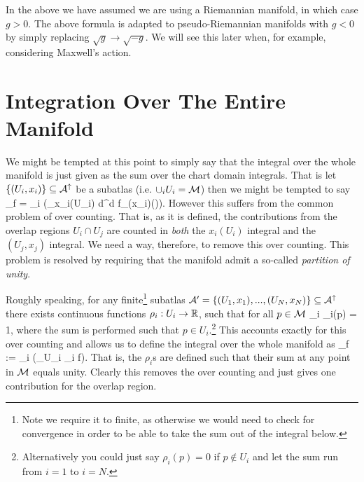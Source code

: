 \br 
    In the above we have assumed we are using a Riemannian manifold, in which case $g>0$. The above formula is adapted to pseudo-Riemannian manifolds with $g<0$ by simply replacing $\sqrt{g} \to \sqrt{-g}$. We will see this later when, for example, considering Maxwell's action. 
\er 

\section{Integration Over The Entire Manifold}

We might be tempted at this point to simply say that the integral over the whole manifold is just given as the sum over the chart domain integrals. That is let $\{(U_i,x_i)\}\subseteq\mathcal{A}^{\uparrow}$ be a subatlas (i.e. $\cup_i U_i = \mathcal{M}$) then we might be tempted to say 
\bse 
    \int_{\cM}f = \sum_i \bigg(\int_{x_i(U_i)} d^d\a {} f_{(x_i)}(\a)\bigg).
\ese 
However this suffers from the common problem of over counting. That is, as it is defined, the contributions from the overlap regions $U_i\cap U_j$ are counted in \textit{both} the $x_i(U_i)$ integral and the $(U_j,x_j)$ integral. We need a way, therefore, to remove this over counting. This problem is resolved by requiring that the manifold admit a so-called \textit{partition of unity}.

Roughly speaking, for any finite\footnote{Note we require it to finite, as otherwise we would need to check for convergence in order to be able to take the sum out of the integral below.} subatlas $\mathcal{A}' = \{ (U_1,x_1),...,(U_N,x_N) \} \subseteq \mathcal{A}^{\uparrow}$ there exists continuous functions $\rho_i : U_i \to \mathbb{R}$, such that for all $p\in\mathcal{M}$ 
\bse 
    \sum_i \rho_i(p) = 1,
\ese
where the sum is performed such that $p\in U_i$.\footnote{Alternatively you could just say $\rho_i(p) = 0$ if $p\notin U_i$ and let the sum run from $i=1$ to $i=N$.} This accounts exactly for this over counting and allows us to define the integral over the whole manifold as
\bse 
    \int_{\cM}f := \sum_i \bigg(\int_{U_i} \rho_i \cdot f\bigg).
\ese 
That is, the $\rho_i$s are defined such that their sum at any point in $\mathcal{M}$ equals unity. Clearly this removes the over counting and just gives one contribution for the overlap region.

